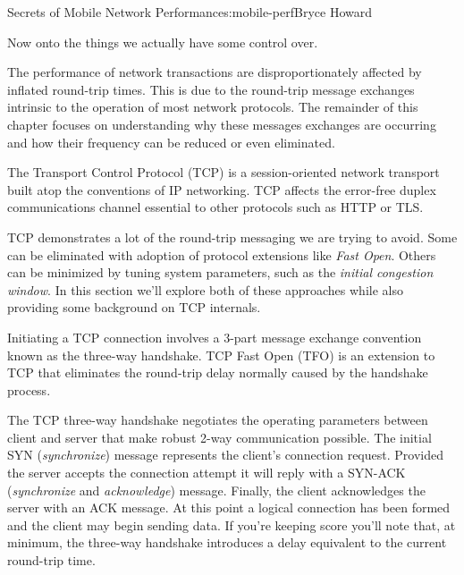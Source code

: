 \begin{aosachapter}{Secrets of Mobile Network Performance}{s:mobile-perf}{Bryce Howard}

Now onto the things we actually have some control over.

The performance of network transactions are disproportionately affected
by inflated round-trip times. This is due to the round-trip message
exchanges intrinsic to the operation of most network protocols. The
remainder of this chapter focuses on understanding why these messages
exchanges are occurring and how their frequency can be reduced or even
eliminated.



The Transport Control Protocol (TCP) is a session-oriented network
transport built atop the conventions of IP networking. TCP affects the
error-free duplex communications channel essential to other protocols
such as HTTP or TLS.

TCP demonstrates a lot of the round-trip messaging we are trying to
avoid. Some can be eliminated with adoption of protocol extensions like
\emph{Fast Open}. Others can be minimized by tuning system parameters,
such as the \emph{initial congestion window}. In this section we'll
explore both of these approaches while also providing some background on
TCP internals.


Initiating a TCP connection involves a 3-part message exchange
convention known as the three-way handshake. TCP Fast Open (TFO) is an
extension to TCP that eliminates the round-trip delay normally caused by
the handshake process.

The TCP three-way handshake negotiates the operating parameters between
client and server that make robust 2-way communication possible. The
initial SYN (\emph{synchronize}) message represents the client's
connection request. Provided the server accepts the connection attempt
it will reply with a SYN-ACK (\emph{synchronize} and \emph{acknowledge})
message. Finally, the client acknowledges the server with an ACK
message. At this point a logical connection has been formed and the
client may begin sending data. If you're keeping score you'll note that,
at minimum, the three-way handshake introduces a delay equivalent to the
current round-trip time.



\end{aosachapter}
